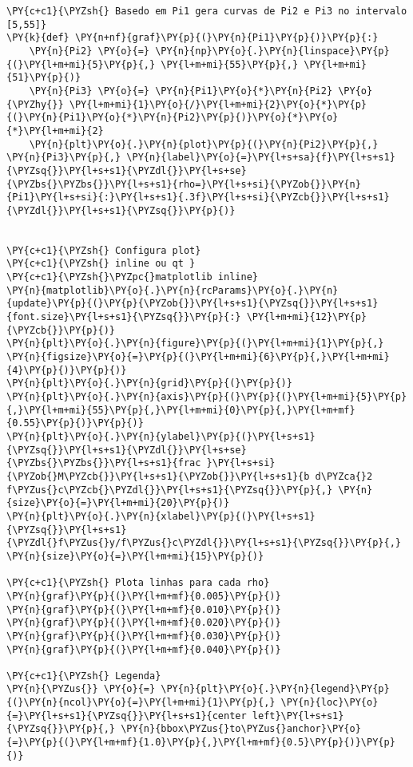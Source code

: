     \begin{tcolorbox}[breakable, size=fbox, boxrule=1pt, pad at break*=1mm,colback=cellbackground, colframe=cellborder]
\begin{Verbatim}[commandchars=\\\{\}]
\PY{c+c1}{\PYZsh{} Basedo em Pi1 gera curvas de Pi2 e Pi3 no intervalo [5,55]}
\PY{k}{def} \PY{n+nf}{graf}\PY{p}{(}\PY{n}{Pi1}\PY{p}{)}\PY{p}{:}
    \PY{n}{Pi2} \PY{o}{=} \PY{n}{np}\PY{o}{.}\PY{n}{linspace}\PY{p}{(}\PY{l+m+mi}{5}\PY{p}{,} \PY{l+m+mi}{55}\PY{p}{,} \PY{l+m+mi}{51}\PY{p}{)}
    \PY{n}{Pi3} \PY{o}{=} \PY{n}{Pi1}\PY{o}{*}\PY{n}{Pi2} \PY{o}{\PYZhy{}} \PY{l+m+mi}{1}\PY{o}{/}\PY{l+m+mi}{2}\PY{o}{*}\PY{p}{(}\PY{n}{Pi1}\PY{o}{*}\PY{n}{Pi2}\PY{p}{)}\PY{o}{*}\PY{o}{*}\PY{l+m+mi}{2}
    \PY{n}{plt}\PY{o}{.}\PY{n}{plot}\PY{p}{(}\PY{n}{Pi2}\PY{p}{,} \PY{n}{Pi3}\PY{p}{,} \PY{n}{label}\PY{o}{=}\PY{l+s+sa}{f}\PY{l+s+s1}{\PYZsq{}}\PY{l+s+s1}{\PYZdl{}}\PY{l+s+se}{\PYZbs{}\PYZbs{}}\PY{l+s+s1}{rho=}\PY{l+s+si}{\PYZob{}}\PY{n}{Pi1}\PY{l+s+si}{:}\PY{l+s+s1}{.3f}\PY{l+s+si}{\PYZcb{}}\PY{l+s+s1}{\PYZdl{}}\PY{l+s+s1}{\PYZsq{}}\PY{p}{)}
    
    
\PY{c+c1}{\PYZsh{} Configura plot}
\PY{c+c1}{\PYZsh{} inline ou qt }
\PY{c+c1}{\PYZsh{}\PYZpc{}matplotlib inline}
\PY{n}{matplotlib}\PY{o}{.}\PY{n}{rcParams}\PY{o}{.}\PY{n}{update}\PY{p}{(}\PY{p}{\PYZob{}}\PY{l+s+s1}{\PYZsq{}}\PY{l+s+s1}{font.size}\PY{l+s+s1}{\PYZsq{}}\PY{p}{:} \PY{l+m+mi}{12}\PY{p}{\PYZcb{}}\PY{p}{)}
\PY{n}{plt}\PY{o}{.}\PY{n}{figure}\PY{p}{(}\PY{l+m+mi}{1}\PY{p}{,} \PY{n}{figsize}\PY{o}{=}\PY{p}{(}\PY{l+m+mi}{6}\PY{p}{,}\PY{l+m+mi}{4}\PY{p}{)}\PY{p}{)}
\PY{n}{plt}\PY{o}{.}\PY{n}{grid}\PY{p}{(}\PY{p}{)}
\PY{n}{plt}\PY{o}{.}\PY{n}{axis}\PY{p}{(}\PY{p}{(}\PY{l+m+mi}{5}\PY{p}{,}\PY{l+m+mi}{55}\PY{p}{,}\PY{l+m+mi}{0}\PY{p}{,}\PY{l+m+mf}{0.55}\PY{p}{)}\PY{p}{)}
\PY{n}{plt}\PY{o}{.}\PY{n}{ylabel}\PY{p}{(}\PY{l+s+s1}{\PYZsq{}}\PY{l+s+s1}{\PYZdl{}}\PY{l+s+se}{\PYZbs{}\PYZbs{}}\PY{l+s+s1}{frac }\PY{l+s+si}{\PYZob{}M\PYZcb{}}\PY{l+s+s1}{\PYZob{}}\PY{l+s+s1}{b d\PYZca{}2 f\PYZus{}c\PYZcb{}\PYZdl{}}\PY{l+s+s1}{\PYZsq{}}\PY{p}{,} \PY{n}{size}\PY{o}{=}\PY{l+m+mi}{20}\PY{p}{)}
\PY{n}{plt}\PY{o}{.}\PY{n}{xlabel}\PY{p}{(}\PY{l+s+s1}{\PYZsq{}}\PY{l+s+s1}{\PYZdl{}f\PYZus{}y/f\PYZus{}c\PYZdl{}}\PY{l+s+s1}{\PYZsq{}}\PY{p}{,} \PY{n}{size}\PY{o}{=}\PY{l+m+mi}{15}\PY{p}{)}

\PY{c+c1}{\PYZsh{} Plota linhas para cada rho}
\PY{n}{graf}\PY{p}{(}\PY{l+m+mf}{0.005}\PY{p}{)}
\PY{n}{graf}\PY{p}{(}\PY{l+m+mf}{0.010}\PY{p}{)}
\PY{n}{graf}\PY{p}{(}\PY{l+m+mf}{0.020}\PY{p}{)}
\PY{n}{graf}\PY{p}{(}\PY{l+m+mf}{0.030}\PY{p}{)}
\PY{n}{graf}\PY{p}{(}\PY{l+m+mf}{0.040}\PY{p}{)}

\PY{c+c1}{\PYZsh{} Legenda}
\PY{n}{\PYZus{}} \PY{o}{=} \PY{n}{plt}\PY{o}{.}\PY{n}{legend}\PY{p}{(}\PY{n}{ncol}\PY{o}{=}\PY{l+m+mi}{1}\PY{p}{,} \PY{n}{loc}\PY{o}{=}\PY{l+s+s1}{\PYZsq{}}\PY{l+s+s1}{center left}\PY{l+s+s1}{\PYZsq{}}\PY{p}{,} \PY{n}{bbox\PYZus{}to\PYZus{}anchor}\PY{o}{=}\PY{p}{(}\PY{l+m+mf}{1.0}\PY{p}{,}\PY{l+m+mf}{0.5}\PY{p}{)}\PY{p}{)}
\end{Verbatim}
\end{tcolorbox}

